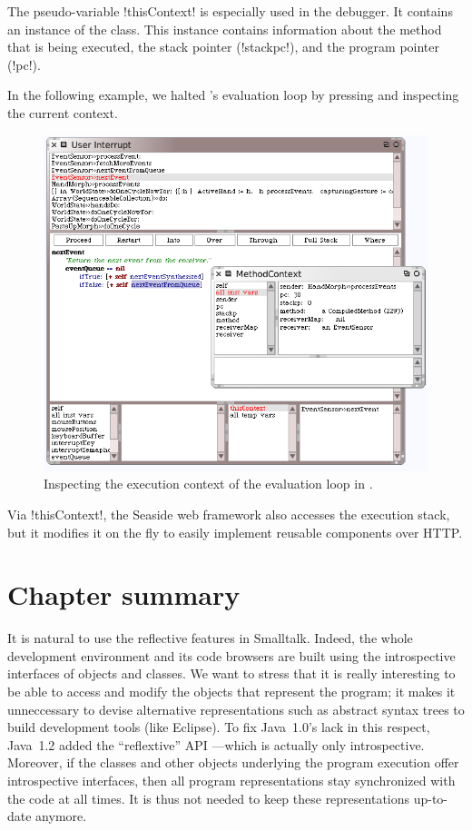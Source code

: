 \documentclass[a4paper,10pt,twoside]{book}
\begin{document}
The pseudo-variable \ct!thisContext! is especially used in the \sq debugger.
It contains an instance of the  class.
This instance contains information about the method that is being executed, the stack pointer (\ct!stackpc!), and the program pointer (\ct!pc!).

In the following example, we halted \sq's evaluation loop by pressing  and inspecting the current context.

\begin{figure}[ht]\centering
	\includegraphics[width=\linewidth]{MethodContext}
	\caption{Inspecting the execution context of the evaluation loop in \sq.\label{fig:MethodContext}}
\end{figure}

Via \ct!thisContext!, the Seaside web framework also accesses the execution stack, but it modifies it on the fly to easily implement reusable components over HTTP.



\section{Chapter summary}

It is natural to use the reflective features in Smalltalk.
Indeed, the whole development environment and its code browsers are built using the introspective interfaces of objects and classes.
We want to stress that it is really interesting to be able to access and modify the objects that represent the program; it makes it unneccessary to devise alternative representations such as abstract syntax trees to build development tools (like Eclipse).
To fix Java~1.0's lack in this respect, Java~1.2 added the ``reflextive'' API ---which is actually only introspective.
Moreover, if the classes and other objects underlying the program execution offer introspective interfaces, then all program representations stay synchronized with the code at all times.
It is thus not needed to keep these representations up-to-date anymore.



\ifx\wholebook\relax\else
\end{document}
